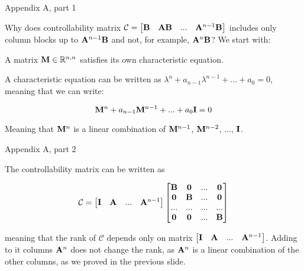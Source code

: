 \documentclass{beamer}
\begin{document}
\begin{frame}{Appendix A, part 1}
	\begin{flushleft}
		
		Why does controllability matrix $\mathcal{C} = \begin{bmatrix}
			\mathbf{B} &
			\mathbf{A} \mathbf{B} & ... &
			\mathbf{A}^{n - 1} \mathbf{B}
		\end{bmatrix}$  includes only column blocks up to $\mathbf{A}^{n - 1} \mathbf{B}$ and not, for example, $\mathbf{A}^n \mathbf{B}$? We start with:
	
		\begin{theorem}
			A matrix $\mathbf{M} \in \mathbb{R}^{n, n}$ satisfies its own characteristic equation.
		\end{theorem}
	
		A characteristic equation can be written as $\lambda^n + a_{n-1}\lambda^{n-1} + ... + a_0  = 0$, meaning that we can write:
		
		\begin{equation}
			\mathbf{M}^n + a_{n-1}\mathbf{M}^{n-1} + ... + a_0\mathbf{I}  = 0
		\end{equation}	
		
		Meaning that $\mathbf{M}^n$ is a linear combination of $\mathbf{M}^{n-1}$, $\mathbf{M}^{n-2}$, ..., $\mathbf{I}$.
	
		
	\end{flushleft}
\end{frame}



\begin{frame}{Appendix A, part 2}
	\begin{flushleft}
		
		The controllability matrix can be written as 
		
		\begin{equation}
			\mathcal{C} = \begin{bmatrix}
				\mathbf{I} &
				\mathbf{A}  & ... &
				\mathbf{A}^{n - 1} 
			\end{bmatrix}
			\begin{bmatrix}
				\mathbf{B} & \mathbf{0} & ... & \mathbf{0} \\
				\mathbf{0}  & \mathbf{B} & ... & \mathbf{0} \\
				...  & ... & ... & ... \\
				\mathbf{0}  & \mathbf{0} & ... & \mathbf{B} 
			\end{bmatrix}
		\end{equation}
		
		meaning that the rank of $\mathcal{C}$ depends only on matrix $\begin{bmatrix}
			\mathbf{I} &
			\mathbf{A}  & ... &
			\mathbf{A}^{n - 1} 
		\end{bmatrix}$. Adding  to it columns $\mathbf{A}^n$ does not change the rank, as $\mathbf{A}^n$ is a linear combination of the other columns, as we proved in the previous slide.
		
	\end{flushleft}
\end{frame}
\end{document}
